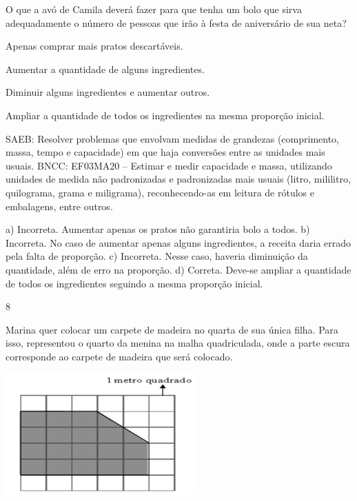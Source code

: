 \begin{multicols}{2}
{\begin{escolha}
{O que a avó de Camila deverá fazer para que tenha um bolo que sirva adequadamente o número de pessoas que irão à festa de aniversário de sua neta?

\begin{escolha}
\item
  Apenas comprar mais pratos descartáveis.
\item
  Aumentar a quantidade de alguns ingredientes.
\item
  Diminuir alguns ingredientes e aumentar outros.
\item
  Ampliar a quantidade de todos os ingredientes na mesma proporção inicial.
\end{escolha}

SAEB: Resolver problemas que envolvam medidas de grandezas (comprimento, massa, tempo e capacidade) em que haja conversões entre as
unidades mais usuais.
BNCC: EF03MA20 -- Estimar e medir capacidade e massa, utilizando unidades de medida não
padronizadas e padronizadas mais usuais (litro, mililitro, quilograma, grama e miligrama),
reconhecendo-as em leitura de rótulos e embalagens, entre outros.

a) Incorreta. Aumentar apenas os pratos não garantiria bolo a todos.
b) Incorreta. No caso de aumentar apenas alguns ingredientes, a receita daria errado pela falta de proporção.
c) Incorreta. Nesse caso, haveria diminuição da quantidade, além de erro na proporção.
d) Correta. Deve-se ampliar a quantidade de todos os ingredientes seguindo a mesma proporção inicial.

\num{8}

Marina quer colocar um carpete de madeira no quarta de sua única filha.
Para isso, representou o quarto da menina na malha quadriculada, onde a parte escura corresponde ao carpete de madeira que será
colocado.


\includegraphics[width=2.90385in,height=1.84662in]{media/image123.png}

}
\end{escolha}}
\end{multicols}
